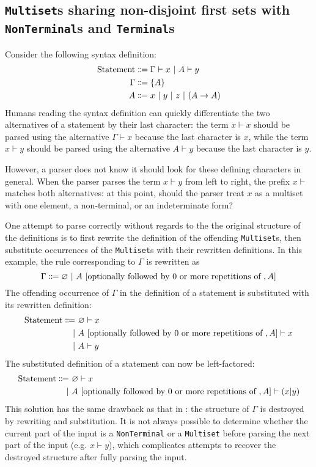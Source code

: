 \subsection{\texorpdfstring{\lstinline{Multiset}}{Multiset}s sharing non-disjoint first sets with \texorpdfstring{\lstinline{NonTerminal}}{NonTerminal}s and \texorpdfstring{\lstinline{Terminal}}{Terminal}s}
Consider the following syntax definition:
\begin{align*}
    \text{Statement} &\Coloneqq \Gamma \vdash x \ |\  A \vdash y \\
    \Gamma &\Coloneqq \{ A \} \\
    A &\Coloneqq x \ |\  y \ |\  z \ |\  (A \to A)
\end{align*}
Humans reading the syntax definition can quickly differentiate the two alternatives of a statement by their last character: the term $x \vdash x$ should be parsed using the alternative $\Gamma \vdash x$ because the last character is $x$, while the term $x \vdash y$ should be parsed using the alternative $A \vdash y$ because the last character is $y$.

However, a parser does not know it should look for these defining characters in general. When the parser parses the term $x \vdash y$ from left to right, the prefix $x \vdash$ matches both alternatives: at this point, should the parser treat $x$ as a multiset with one element, a non-terminal, or an indeterminate form?

One attempt to parse correctly without regards to the the original structure of the definitions is to first rewrite the definition of the offending \lstinline{Multiset}s, then substitute occurrences of the \lstinline{Multiset}s with their rewritten definitions. In this example, the rule corresponding to $\Gamma$ is rewritten as
\[
    \Gamma \Coloneqq \varnothing \ |\  A \ [\text{optionally followed by 0 or more repetitions of },A]
\]
The offending occurrence of $\Gamma$ in the definition of a statement is substituted with its rewritten definition:
\begin{align*}
    \text{Statement} \Coloneqq \ &\varnothing \vdash x \\
    \ |\  &A \ [\text{optionally followed by 0 or more repetitions of },A] \vdash x \\
    \ |\  &A \vdash y
\end{align*}
The substituted definition of a statement can now be left-factored:
\begin{align*}
    \text{Statement} \Coloneqq \ &\varnothing \vdash x \\
    \ |\  &A \ [\text{optionally followed by 0 or more repetitions of },A] \vdash (x|y) 
\end{align*}
This solution has the same drawback as that in : the structure of $\Gamma$ is destroyed by rewriting and substitution. It is not always possible to determine whether the current part of the input is a \lstinline{NonTerminal} or a \lstinline{Multiset} before parsing the next part of the input (e.g. $x \vdash y$), which complicates attempts to recover the destroyed structure after fully parsing the input.


